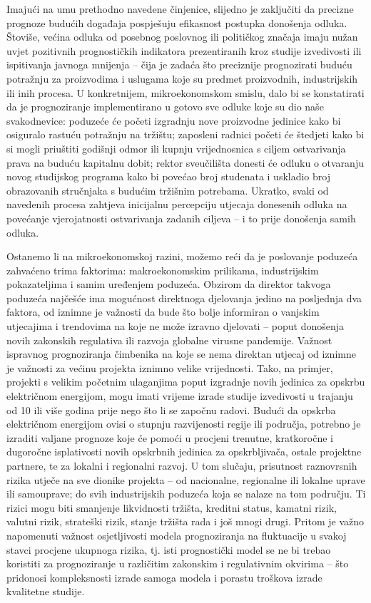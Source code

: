\documentclass[a4paper,12pt,oneside]{memoir}
\begin{document}
        Imajući na umu prethodno navedene činjenice, slijedno je zaključiti da precizne prognoze budućih događaja pospješuju efikasnost postupka donošenja odluka. Štoviše, većina odluka od posebnog poslovnog ili političkog značaja imaju nužan uvjet pozitivnih prognostičkih indikatora prezentiranih kroz studije izvedivosti ili ispitivanja javnoga mnijenja -- čija je zadaća što preciznije prognozirati buduću potražnju za proizvodima i uslugama koje su predmet proizvodnih, industrijskih ili inih procesa. U konkretnijem, mikroekonomskom smislu, dalo bi se konstatirati da je prognoziranje implementirano u gotovo sve odluke koje su dio naše svakodnevice: poduzeće će početi izgradnju nove proizvodne jedinice kako bi osiguralo rastuću potražnju na tržištu; zaposleni radnici početi će štedjeti kako bi si mogli priuštiti godišnji odmor ili kupnju vrijednosnica s ciljem ostvarivanja prava na buduću kapitalnu dobit; rektor sveučilišta donesti će odluku o otvaranju novog studijskog programa kako bi povećao broj studenata i uskladio broj obrazovanih stručnjaka s budućim tržišnim potrebama. Ukratko, svaki od navedenih procesa zahtjeva inicijalnu percepciju utjecaja donesenih odluka na povećanje vjerojatnosti ostvarivanja zadanih ciljeva -- i to prije donošenja samih odluka.


        Ostanemo li na mikroekonomskoj razini, možemo reći da je poslovanje poduzeća zahvaćeno trima faktorima: makroekonomskim prilikama, industrijskim pokazateljima i samim uređenjem poduzeća. Obzirom da direktor takvoga poduzeća najčešće ima mogućnost direktnoga djelovanja jedino na posljednja dva faktora, od iznimne je važnosti da bude što bolje informiran o vanjskim utjecajima i trendovima na koje ne može izravno djelovati -- poput donošenja novih zakonskih regulativa ili razvoja globalne virusne pandemije. Važnost ispravnog prognoziranja čimbenika na koje se nema direktan utjecaj od iznimne je važnosti za većinu projekta iznimno velike vrijednosti. Tako, na primjer, projekti s velikim početnim ulaganjima poput izgradnje novih jedinica za opskrbu električnom energijom, mogu imati vrijeme izrade studije izvedivosti u trajanju od 10 ili više godina prije nego što li se započnu radovi. Budući da opskrba električnom energijom ovisi o stupnju razvijenosti regije ili područja, potrebno je izraditi valjane prognoze koje će pomoći u procjeni trenutne, kratkoročne i dugoročne isplativosti novih opskrbnih jedinica za opskrbljivača, ostale projektne partnere, te za lokalni i regionalni razvoj. U tom slučaju, prisutnost raznovrsnih rizika utječe na sve dionike projekta -- od nacionalne, regionalne ili lokalne uprave ili samouprave; do svih industrijskih poduzeća koja se nalaze na tom području. Ti rizici mogu biti smanjenje likvidnosti tržišta, kreditni status, kamatni rizik, valutni rizik, strateški rizik, stanje tržišta rada i još mnogi drugi. Pritom je važno napomenuti važnost osjetljivosti modela prognoziranja na fluktuacije u svakoj stavci procjene ukupnoga rizika, tj. isti prognostički model se ne bi trebao koristiti za prognoziranje u različitim zakonskim i regulativnim okvirima -- što pridonosi kompleksnosti izrade samoga modela i porastu troškova izrade kvalitetne studije.
\end{document}
